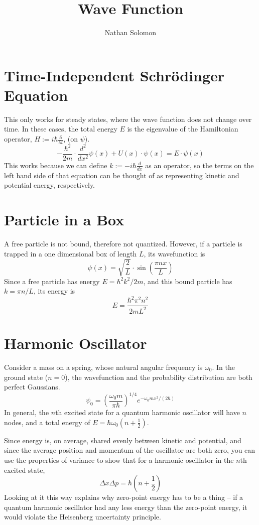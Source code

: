 \documentclass[12pt]{article}
\begin{document}
\title{Wave Function}
\author{Nathan Solomon}
\maketitle

\section{Time-Independent Schrödinger Equation}
This only works for steady states, where the wave function does not change over time. In these cases, the total energy $E$ is the eigenvalue of the Hamiltonian operator, $H := i \hbar \frac{\partial}{\partial t}$, (on $\psi$).
\[ - \frac{\hbar^2}{2m} \cdot \frac{d^2}{dx^2} \psi(x) + U(x) \cdot \psi(x) = E \cdot \psi(x) \]
This works because we can define $k := -i \hbar \frac{d}{dx}$ as an operator, so the terms on the left hand side of that equation can be thought of as representing kinetic and potential energy, respectively.

\section{Particle in a Box}
A free particle is not bound, therefore not quantized. However, if a particle is trapped in a one dimensional box of length $L$, its wavefunction is
\[ \psi(x) = \sqrt{ \frac{2}{L} } \cdot \sin \left( \frac{\pi n x}{L} \right) \]
Since a free particle has energy $E = \hbar^2 k^2 / 2m$, and this bound particle has $k = \pi n / L$, its energy is
\[ E = \frac{\hbar^2 \pi^2 n^2}{2 m L^2} \]

\section{Harmonic Oscillator}
Consider a mass on a spring, whose natural angular frequency is $\omega_0$. In the ground state ($n=0$), the wavefunction and the probability distribution are both perfect Gaussians.
\[ \psi_0 = \left( \frac{\omega_0 m}{\pi \hbar} \right)^{1/4} e^{- \omega_0 m x^2 / (2 \hbar)} \]
In general, the $n$th excited state for a quantum harmonic oscillator will have $n$ nodes, and a total energy of $E= \hbar \omega_0 (n + \frac{1}{2})$.

Since energy is, on average, shared evenly between kinetic and potential, and since the average position and momentum of the oscillator are both zero, you can use the properties of variance to show that for a harmonic oscillator in the $n$th excited state,
\[ \Delta x \Delta p = \hbar (n + \frac{1}{2}) \]
Looking at it this way explains why zero-point energy has to be a thing -- if a quantum harmonic oscillator had any less energy than the zero-point energy, it would violate the Heisenberg uncertainty principle.
\end{document}
